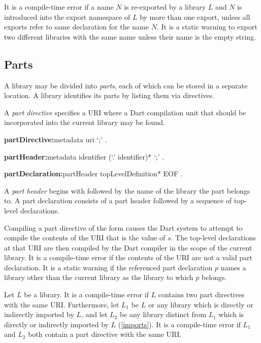 \documentclass{article}
\begin{document}
\LMHash{}
It is a compile-time error if a name $N$ is re-exported by a library $L$ and $N$ is introduced into the export namespace of $L$ by more than one export, unless all exports refer to same declaration for the name $N$.
It is a static warning to export two different libraries with the same name unless their name is the empty string.


\subsection{Parts}

\LMHash{}
A library may be divided into {\em parts}, each of which can be stored in a separate location.
A library identifies its parts by listing them via \PART{} directives.

\LMHash{}
A {\em part directive} specifies a URI where a Dart compilation unit that should be incorporated into the current library may be found.

\begin{grammar}
{\bf partDirective:}metadata \PART{} uri `{\escapegrammar ;}'
  .

{\bf partHeader:}metadata \PART{} \OF{} identifier (`{\escapegrammar .}' identifier)* `{\escapegrammar ;}'
  .

{\bf partDeclaration:}partHeader topLevelDefinition* EOF
  .
\end{grammar}

\LMHash{}
A {\em part header} begins with \PART{} \OF{} followed by the name of the library the part belongs to.
A part declaration consists of a part header followed by a sequence of top-level declarations.

\LMHash{}
Compiling a part directive of the form  causes the Dart system to attempt to compile the contents of the URI that is the value of $s$.
The top-level declarations at that URI are then compiled by the Dart compiler in the scope of the current library.
It is a compile-time error if the contents of the URI are not a valid part declaration.
It is a static warning if the referenced part declaration $p$ names a library other than the current library as the library to which $p$ belongs.

\LMHash{}
Let $L$ be a library.
It is a compile-time error if $L$ contains two part directives with the same URI.
Furthermore,
let $L_1$ be $L$ or any library which is directly or indirectly imported by $L$,
and let $L_2$ be any library distinct from $L_1$ which is directly or indirectly imported by $L$
(\ref{imports}).
It is a compile-time error if $L_1$ and $L_2$ both contain a part directive with the same URI.
\end{document}
